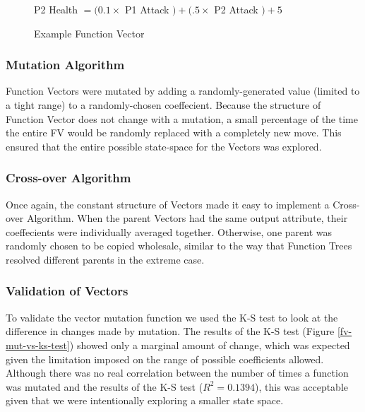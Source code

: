\documentclass{acm_proc_article-sp}
\begin{document}
    \begin{figure}[h]
        \centering
        P2 Health $= (0.1 \times $ P1 Attack $) + (.5 \times $ P2 Attack $) + 5$
        \caption{Example Function Vector}
        \label{example-function-vector}
    \end{figure}
    
    \subsubsection{Mutation Algorithm}
    Function Vectors were mutated by adding a randomly-generated value (limited to a tight range) to a randomly-chosen coeffecient. Because the structure of Function Vector does not change with a mutation, a small percentage of the time the entire FV would be randomly replaced with a completely new move. This ensured that the entire possible state-space for the Vectors was explored.
    
    \subsubsection{Cross-over Algorithm}
    Once again, the constant structure of Vectors made it easy to implement a Cross-over Algorithm. When the parent Vectors had the same output attribute, their coeffecients were individually averaged together. Otherwise, one parent was randomly chosen to be copied wholesale, similar to the way that Function Trees resolved different parents in the extreme case.
    
    \subsubsection{Validation of Vectors}
    To validate the vector mutation function we used the K-S test to look at the difference in changes made by mutation. The results of the K-S test (Figure \ref{fv-mut-vs-ks-test}) showed only a marginal amount of change, which was expected given the limitation imposed on the range of possible coefficients allowed. Although there was no real correlation between the number of times a function was mutated and the results of the K-S test ($R^2 = 0.1394$), this was acceptable given that we were intentionally exploring a smaller state space.
    
\end{document}
